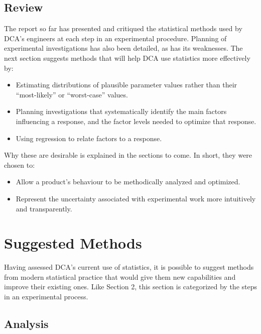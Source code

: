 \documentclass[11pt,a4paper,article]{memoir} %
\begin{document}
\section{Review}
The report so far has presented and critiqued the statistical methods used by DCA's engineers at each step in an experimental procedure. Planning of experimental investigations has also been detailed, as has its weaknesses. The next section suggests methods that will help DCA use statistics more effectively by:
\begin{itemize}
\item Estimating distributions of plausible parameter values rather than their ``most-likely'' or ``worst-case'' values.
\item Planning investigations that systematically identify the main factors influencing a response, and the factor levels needed to optimize that response.
\item Using regression to relate factors to a response.
\end{itemize}
Why these are desirable is explained in the sections to come. In short, they were chosen to:
\begin{itemize}
\item Allow a product's behaviour to be methodically analyzed and optimized.
\item Represent the uncertainty associated with experimental work more intuitively and transparently.
\end{itemize}

\newpage
\chapter{Suggested Methods}\label{suggested_methods}
\label{chap:modernstats}

Having assessed DCA's current use of statistics, it is possible to suggest methods from modern statistical practice that would give them new capabilities and improve their existing ones. Like Section 2, this section is categorized by the steps in an experimental process.


\newpage
\section{Analysis}
\end{document}
